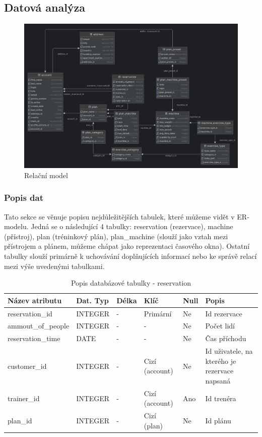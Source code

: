 \subsection{Datová analýza}

\begin{figure}[h!]
	\includegraphics[width=1\textwidth]{Figures/ermodel.png}
	\caption{ Relační model}
	\label{fig:RelationalModel}
\end{figure}

\subsubsection{Popis dat}
Tato sekce se věnuje popisu nejdůležitějších tabulek, které můžeme vidět v ER-modelu. Jedná se o následující 4 tabulky: reservation (rezervace), machine (přístroj), plan (tréninkový plán), plan\_machine (slouží jako vztah mezi přístrojem a plánem, můžeme chápat jako reprezentaci časového okna). Ostatní tabulky slouží primárně k uchovávání doplňujících informací nebo ke správě relací mezi výše uvedenými tabulkami.

\begin{table}[h!]
	\caption{Popis databázové tabulky - reservation}
    \label{tab:dat-dictionary-reservation}
	\begin{tabular}{|p{3.5cm}|p{2cm}|p{1cm}|p{2.5cm}|p{.75cm}|p{3.75cm}|}
		\hline
        \textbf{Název atributu} & \textbf{Dat. Typ} & \textbf{Délka} & \textbf{Klíč} & \textbf{Null} & \textbf{Popis} \\
        \hline
        reservation\_id & INTEGER & - & Primární & Ne & Id rezervace \\
        \hline
        ammout\_of\_people & INTEGER & - & - & Ne & Počet lidí \\
        \hline
        reservation\_time & DATE & - & - & Ne & Čas příchodu \\
        \hline
        customer\_id & INTEGER & - & Cizí (account) & Ne & Id uživatele, na kterého je rezervace napsaná \\
        \hline
        trainer\_id & INTEGER & - & Cizí (account) & Ano & Id trenéra \\
        \hline
        plan\_id & INTEGER & - & Cizí (plan) & Ne & Id plánu \\
        \hline
	\end{tabular}
\end{table}

